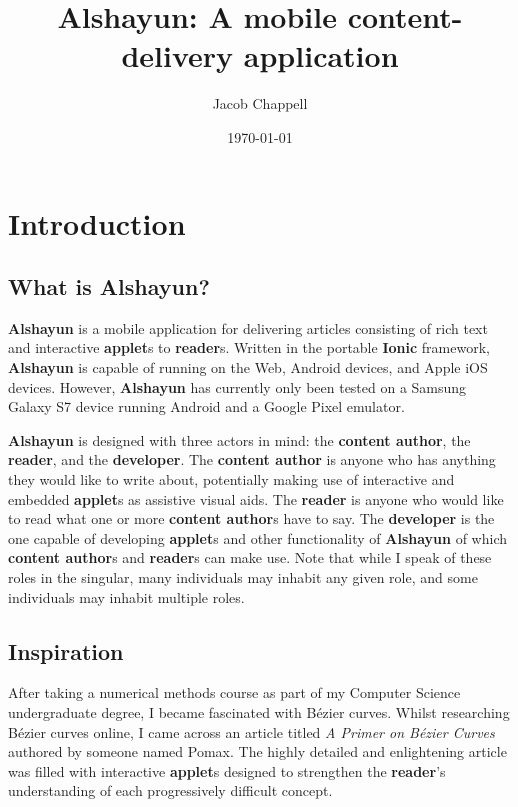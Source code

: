 \documentclass[12pt]{report}
\begin{document}
\title{Alshayun: A mobile content-delivery application}
\author{Jacob Chappell}
\date{\today}
\maketitle

\tableofcontents
\listoffigures


\chapter{Introduction}

    \section{What is Alshayun?}

\textbf{Alshayun} is a mobile application for delivering articles consisting of
rich text and interactive \textbf{applet}s to \textbf{reader}s. Written in the
portable \textbf{Ionic} framework, \textbf{Alshayun} is capable of running on
the Web, Android devices, and Apple iOS devices. However, \textbf{Alshayun} has
currently only been tested on a Samsung Galaxy S7 device running Android and a
Google Pixel emulator.

\textbf{Alshayun} is designed with three actors in mind: the \textbf{content
author}, the \textbf{reader}, and the \textbf{developer}. The \textbf{content
author} is anyone who has anything they would like to write about, potentially
making use of interactive and embedded \textbf{applet}s as assistive visual
aids. The \textbf{reader} is anyone who would like to read what one or more
\textbf{content author}s have to say. The \textbf{developer} is the one capable of
developing \textbf{applet}s and other functionality of \textbf{Alshayun} of
which \textbf{content author}s and \textbf{reader}s can make use. Note that
while I speak of these roles in the singular, many individuals may inhabit any
given role, and some individuals may inhabit multiple roles.

    \section{Inspiration}

After taking a numerical methods course as part of my Computer Science
undergraduate degree, I became fascinated with Bézier curves. Whilst researching
Bézier curves online, I came across an article titled \textit{A Primer on Bézier
Curves} \cite{pomax} authored by someone named Pomax. The highly detailed and
enlightening article was filled with interactive \textbf{applet}s designed to
strengthen the \textbf{reader}'s understanding of each progressively difficult
concept.
\end{document}
